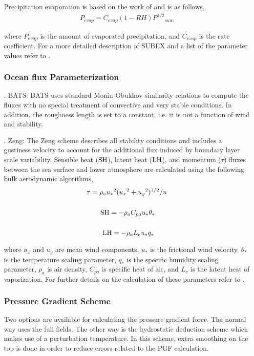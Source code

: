Precipitation evaporation is based on the work of 
\cite{Sundqvist_89} and is as follows,
\begin{eqnarray}
P_{evap} = C_{evap} (1-RH) {P^{1/2}}_{sum}
\end{eqnarray}

\noindent
where $P_{evap}$ is the amount of evaporated precipitation, and 
$C_{evap}$ is the rate coefficient.  For a more detailed description 
of SUBEX and a list of the parameter values refer to \cite{Pal_00}. 



\subsubsection{Ocean flux Parameterization} 
.  BATS: {BATS} uses standard Monin-Obukhov similarity relations to compute the fluxes with no special treatment of convective and very stable conditions.  In addition, the roughness length is set to a constant, i.e. it is not a function of wind and stability.  

.  Zeng:  The Zeng scheme describes all stability conditions and includes a gustiness velocity to account for the additional flux induced by boundary layer scale variability. Sensible heat (${\rm SH}$), latent heat (${\rm LH}$), 
and momentum ($\tau$) fluxes between the sea surface and 
lower atmosphere are calculated using the following 
bulk aerodynamic algorithms, 
\begin{eqnarray}
\tau = \rho_a {u_{\ast}}^2 ({u_{x}}^2 + {u_{y}}^2)^{1/2} / u \\ \nonumber \\
{\rm SH} = -\rho_a C_{pa} u_{\ast} \theta_{\ast} \hspace{.6cm} \\ \nonumber \\
{\rm LH} =  -\rho_a L_{e} u_{\ast} q_{\ast}  \hspace{.65cm}
\end{eqnarray}

\noindent
where $u_x$ and $u_y$ are mean wind components, $u_{\ast}$ is the frictional wind velocity, 
$\theta_{\ast}$ is the temperature scaling parameter, $q_{\ast}$ is the specific humidity 
scaling parameter,  $\rho_a$ is air density, $C_{pa}$ is specific heat of air, and $L_{e}$ is 
the latent heat of vaporization.  For further details on the calculation of these
parameters refer to \cite{Zeng_98}.
 

\subsubsection{Pressure Gradient Scheme}
Two options are available for calculating the pressure gradient force.  The normal 
way uses the full fields.  The other way is the hydrostatic deduction scheme 
which makes use of a perturbation temperature.  In this scheme, extra smoothing
on the top is done in order to reduce errors related to the PGF calculation. 

